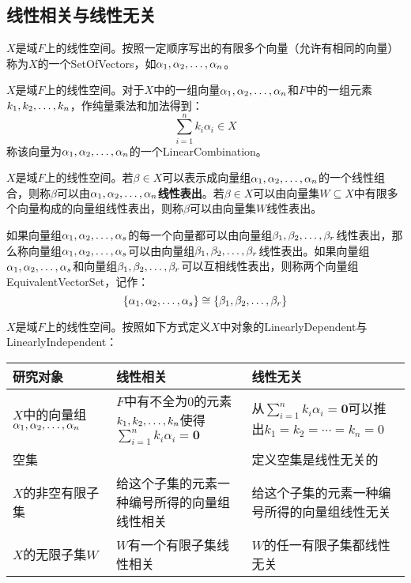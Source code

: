 \subsection{线性相关与线性无关}
\begin{definition}
	$X$是域$F$上的线性空间。按照一定顺序写出的有限多个向量（允许有相同的向量）称为$X$的一个\gls{SetOfVectors}，如$\alpha_1, \alpha_2, \dots, \alpha_{n}$。
\end{definition}
\begin{definition}
	$X$是域$F$上的线性空间。对于$X$中的一组向量$\alpha_1, \alpha_2, \dots, \alpha_{n}$和$F$中的一组元素$k_1, k_2, \dots, k_{n}$，作纯量乘法和加法得到：
	\begin{equation*}
		\sum_{i=1}^{n}k_i\alpha_i\in X
	\end{equation*}
	称该向量为$\alpha_1, \alpha_2, \dots, \alpha_{n}$的一个\gls{LinearCombination}。
\end{definition}
\begin{definition}
	$X$是域$F$上的线性空间。若$\beta\in X$可以表示成向量组$\alpha_1, \alpha_2, \dots, \alpha_{n}$的一个线性组合，则称$\beta$可以由$\alpha_1, \alpha_2, \dots, \alpha_{n}$\textbf{线性表出}。若$\beta\in X$可以由向量集$W\subseteq X$中有限多个向量构成的向量组线性表出，则称$\beta$可以由向量集$W$线性表出。
\end{definition}
\begin{definition}
	如果向量组$\alpha_1, \alpha_2, \dots, \alpha_{s}$的每一个向量都可以由向量组$\beta_1, \beta_2, \dots, \beta_{r}$线性表出，那么称向量组$\alpha_1, \alpha_2, \dots, \alpha_{s}$可以由向量组$\beta_1, \beta_2, \dots, \beta_{r}$线性表出。如果向量组$\alpha_1, \alpha_2, \dots, \alpha_{s}$和向量组$\beta_1, \beta_2, \dots, \beta_{r}$可以互相线性表出，则称两个向量组\gls{EquivalentVectorSet}，记作：
	\begin{equation*}
		\{\alpha_1, \alpha_2, \dots, \alpha_{s}\}\cong\{\beta_1, \beta_2, \dots, \beta_{r}\}
	\end{equation*}
\end{definition}
\begin{definition}
	$X$是域$F$上的线性空间。按照如下方式定义$X$中对象的\gls{LinearlyDependent}与\gls{LinearlyIndependent}：
	\begin{table}[H]
		\centering
		\begin{tabular}{>{\centering\arraybackslash}p{4cm}|>{\centering\arraybackslash}p{5cm}|>{\centering\arraybackslash}p{6cm}}
			\toprule
			\textbf{研究对象} & \textbf{线性相关} & \textbf{线性无关} \\
			\midrule
			$X$中的向量组$\alpha_1, \alpha_2, \dots, \alpha_{n}$ & $F$中有不全为$0$的元素$k_1, k_2, \dots, k_{n}$使得$\sum\limits_{i=1}^{n}k_i\alpha_i=\mathbf{0}$ & 从$\sum\limits_{i=1}^{n}k_i\alpha_i=\mathbf{0}$可以推出$k_1=k_2=\cdots=k_n=0$ \\
			\hline
			空集 & & 定义空集是线性无关的\\
			\hline
			$X$的非空有限子集 & 给这个子集的元素一种编号所得的向量组线性相关 & 给这个子集的元素一种编号所得的向量组线性无关 \\
			\hline
			$X$的无限子集$W$ & $W$有一个有限子集线性相关 & $W$的任一有限子集都线性无关 \\
			\bottomrule
		\end{tabular}
	\end{table}
\end{definition}
